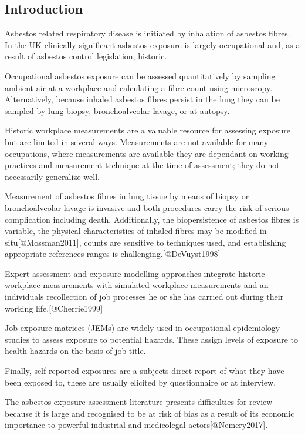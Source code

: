 \documentclass[
]{article}
\begin{document}
\hypertarget{introduction-2}{%
\subsection{Introduction}\label{introduction-2}}

Asbestos related respiratory disease is initiated by inhalation of
asbestos fibres. In the UK clinically significant asbestos exposure is
largely occupational and, as a result of asbestos control legislation,
historic.

Occupational asbestos exposure can be assessed quantitatively by
sampling ambient air at a workplace and calculating a fibre count using
microscopy. Alternatively, because inhaled asbestos fibres persist in
the lung they can be sampled by lung biopsy, bronchoalveolar lavage, or
at autopsy.

Historic workplace measurements are a valuable resource for assessing
exposure but are limited in several ways. Measurements are not available
for many occupations, where measurements are available they are
dependant on working practices and measurement technique at the time of
assessment; they do not necessarily generalize well.

Measurement of asbestos fibres in lung tissue by means of biopsy or
bronchoalveolar lavage is invasive and both procedures carry the risk of
serious complication including death. Additionally, the biopersistence
of asbestos fibres is variable, the physical characteristics of inhaled
fibres may be modified in-situ{[}@Mossman2011{]}, counts are sensitive
to techniques used, and establishing appropriate references ranges is
challenging.{[}@DeVuyst1998{]}

Expert assessment and exposure modelling approaches integrate historic
workplace measurements with simulated workplace measurements and an
individuals recollection of job processes he or she has carried out
during their working life.{[}@Cherrie1999{]}

Job-exposure matrices (JEMs) are widely used in occupational
epidemiology studies to assess exposure to potential hazards. These
assign levels of exposure to health hazards on the basis of job title.

Finally, self-reported exposures are a subjects direct report of what
they have been exposed to, these are usually elicited by questionnaire
or at interview.

The asbestos exposure assessment literature presents difficulties for
review because it is large and recognised to be at risk of bias as a
result of its economic importance to powerful industrial and medicolegal
actors{[}@Nemery2017{]}.
\end{document}
